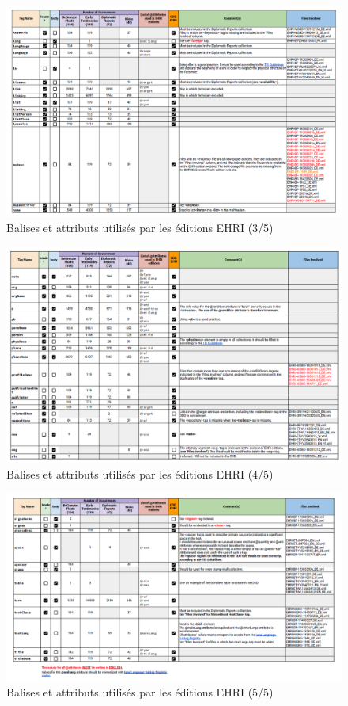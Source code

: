 \begin{figure}[ht]
    \centering
    \includegraphics[width=1\linewidth]{3-ANNEXES/images/encodage-ehri-3.png}
    \caption{Balises et attributs utilisés par les éditions EHRI (3/5)}
    \label{fig:TableauRecap3}
\end{figure}  

\begin{figure}[ht]
    \centering
    \includegraphics[width=1\linewidth]{3-ANNEXES/images/encodage-ehri-4.png}
    \caption{Balises et attributs utilisés par les éditions EHRI (4/5)}
    \label{fig:TableauRecap4}
\end{figure}  

\begin{figure}[ht]
    \centering
    \includegraphics[width=1\linewidth]{3-ANNEXES/images/encodage-ehri-5.png}
    \caption{Balises et attributs utilisés par les éditions EHRI (5/5)}
    \label{fig:TableauRecap5}
\end{figure}  